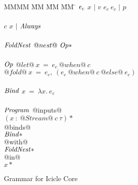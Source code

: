 
\begin{figure}

\begin{tabbing}
MMMM \= MM \= MM \= MM \= \kill
$\mathit{e_c}$
\GrammarDef $x$ \> $|$ \> $v$
\GrammarAlt $e_c~e_c$ \> $|$ \> $p$
\\
\\
$c$
\GrammarDef $x$ \> $|$ \> $\mathit{Always}$
\\
\\
$\mathit{FoldNest}$
\GrammarDef $@nest@~\mathit{Op}*$
\\
\\
$\mathit{Op}$
\GrammarDef $@let@~x~=~e_c~@when@~c$
\GrammarAlt $@fold@~x~=~e_c,~(e_c~@when@~c~@else@~e_c)$
\\
\\
$\mathit{Bind}$
\GrammarDef $x~=~\lambda{}x.~e_c$
\\
\\
$\mathit{Program}$
\GrammarDef @inputs@ \\
    \>      \> \> $(x~:~@Stream@~c~\tau)*$ \\
    \>      \> @binds@ \\
    \>      \> \> $\mathit{Bind}*$ \\
    \>      \> @with@ \\
    \>      \> \> $\mathit{FoldNest}*$ \\
    \>      \> @in@ \\
    \>      \> \> $x*$ \\
\end{tabbing}


\caption{Grammar for Icicle Core}
\label{fig:core:grammar}
\end{figure}

